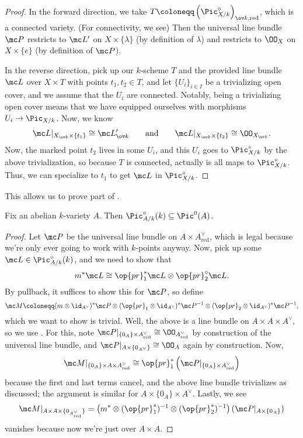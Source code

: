 \documentclass[../notes.tex]{subfiles}
\begin{document}
\begin{proof}
	In the forward direction, we take $T\coloneqq\left(\Pic_{X/k}^\circ\right)_{\ov k,\mathrm{red}}$, which is a connected variety. (For connectivity, we see) Then the universal line bundle $\mc P$ restricts to $\mc L'$ on $X\times\{\lambda\}$ (by definition of $\lambda$) and restricts to $\OO_X$ on $X\times\{e\}$ (by definition of $\mc P$).

	In the reverse direction, pick up our $k$-scheme $T$ and the provided line bundle $\mc L$ over $X\times T$ with points $t_1,t_2\in T$, and let $\{U_i\}_{i\in I}$ be a trivializing open cover, and we assume that the $U_i$ are connected. Notably, being a trivializing open cover means that we have equipped ourselves with morphisms $U_i\to\Pic_{X/k}$. Now, we know
	\[\mc L|_{X_{\ov k}\times\{t_1\}}\cong\mc L_{\ov k}'\qquad\text{and}\qquad\mc L|_{X_{\ov k}\times\{t_2\}}\cong\OO_{X_{\ov k}}.\]
	Now, the marked point $t_2$ lives in some $U_i$, and this $U_i$ goes to $\Pic^\circ_{X/k}$ by the above trivialization, so because $T$ is connected, actually is all maps to $\Pic^\circ_{X/k}$. Thus, we can specialize to $t_1$ to get $\mc L$ in $\Pic^\circ_{X/k}$.
\end{proof}
This allows us to prove part of .
\begin{lemma}
	Fix an abelian $k$-variety $A$. Then $\Pic^\circ_{A/k}(k)\subseteq\Pic^0(A)$.
\end{lemma}
\begin{proof}
	Let $\mc P$ be the universal line bundle on $A\times A^\lor_{\mathrm{red}}$, which is legal because we're only ever going to work with $k$-points anyway. Now, pick up some $\mc L\in\Pic^\circ_{A/k}(k)$, and we need to show that
	\[m^*\mc L\cong\op{pr}_1^*\mc L\otimes\op{pr}_2^\circ\mc L.\]
	By pullback, it suffices to show this for $\mc P$, so define
	\[\mc M\coloneqq (m\otimes{\id_{A^\lor}})^*\mc P\otimes(\op{pr}_1\otimes{\id_{A^\lor}})^*\mc P^{-1}\otimes(\op{pr}_2\otimes{\id_{A^\lor}})^*\mc P^{-1},\]
	which we want to show is trivial. Well, the above is a line bundle on $A\times A\times A^\lor$, so we use . For this, note $\mc P|_{\{0_A\}\times A^\lor_{\mathrm{red}}}\cong\OO_{A^\lor_{\mathrm{red}}}$ by construction of the universal line bundle, and $\mc P|_{A\times\{0_{A^\lor}\}}\cong\OO_A$ again by construction. Now,
	\[\mc M|_{\{0_A\}\times A\times A^\lor_{\mathrm{red}}}\cong\op{pr}_1^*\left(\mc P|_{\{0_A\}\times A^\lor_{\mathrm{red}}}\right)\]
	because the first and last terms cancel, and the above line bundle trivializes as discussed; the argument is similar for $A\times\{0_A\}\times A^\lor$. Lastly, we see
	\[\mc M|_{A\times A\times\{0_{A^\lor_{\mathrm{red}}}\}}=\left(m^*\otimes({\op{pr}_1^*})^{-1}\otimes({\op{pr}_2^*})^{-1}\right)(\mc P|_{A\times\{0_A\}})\]
	vanishes because now we're just over $A\times A$.
\end{proof}
\end{document}

